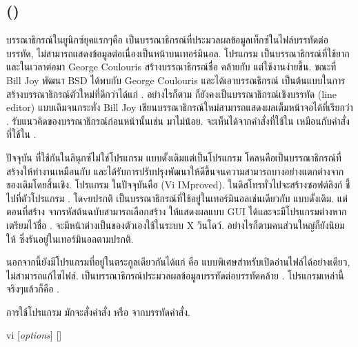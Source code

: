\begin{thwbr}
\subsection{()}
บรรณาธิกรณ์ในยูนิกซ์ยุคแรกๆคือ  เป็นบรรณาธิกรณ์ที่ประมวลผลข้อมูลเท็กซ์ในไฟล์บรรทัดต่อบรรทัด, ไม่สามารถแสดงข้อมูลต่อเนื่องเป็นหน้าบนเทอร์มินอล. โปรแกรม  เป็นบรรณาธิกรณ์ที่ใช้ยากและในเวลาต่อมา George Coulouris\cite{em} สร้างบรรณาธิกรณ์ชื่อ  คล้ายกับ  แต่ใช้งานง่ายขึ้น. ขณะที่ Bill Joy พัฒนา BSD ได้พบกับ George Coulouris และได้เอาบรรณธิกรณ์  เป็นต้นแบบในการสร้างบรรณาธิกรณ์ตัวใหม่ที่ดีกว่าได้แก่ . อย่างไรก็ตาม  ก็ยังคงเป็นบรรณาธิกรณ์เชิงบรรทัด (line editor) แบบเดิมจนกระทั่ง Bill Joy เขียนบรรณาธิกรณ์ใหม่สามารถแสดงผลเต็มหน้าจอได้ที่เรียกว่า .  รับแนวคิดของบรรณาธิกรณ์ก่อนหน้านั้นเช่น  มาไม่น้อย. จะเห็นได้จากคำสั่งที่ใช้ใน  เหมือนกับคำสั่งที่ใช้ใน . 

ปัจจุบัน  ที่ใช้กันในลินุกซ์ไม่ใช่โปรแกรม  แบบดั้งเดิมแต่เป็นโปรแกรม  โคลนคือเป็นบรรณาธิกรณ์ที่สร้างให้ทำงานเหมือนกับ  และได้รับการปรับปรุงพัฒนาให้ดีขึ้นจนความสามารถบางอย่างแตกต่างจากของเดิมโดยสิ้นเชิง. โปรแกรม  ในปัจจุบันคือ  (Vi IMproved). ในดิสโทรทั่วไปจะสร้างซอฟต์ลิงก์  ชี้ไปที่ตัวโปรแกรม . โดvยปรกติ  เป็นบรรณาธิกรณ์ที่ใช้อยู่ในเทอร์มินอลเช่นเดียวกับ  แบบดั้งเดิม. แต่ตอนที่สร้าง  จากรหัสต้นฉบับสามารถเลือกสร้าง  ให้แสดงผลแบบ GUI ได้และจะมีโปรแกรมต่างหากเตรียมไว้ชื่อ .  จะมีหน้าต่างเป็นของตัวเองใช้ในระบบ X วินโดว์. อย่างไรก็ตามคนส่วนใหญ่ก็ยังนิยมให้  ซึ่งรันอยู่ในเทอร์มินอลตามปรกติ. 

นอกจากนี้ยังมีโปรแกรมที่อยู่ในตระกูลเดียวกันได้แก่  คือ  แบบพิเศษสำหรับเปิดอ่านไฟล์ได้อย่างเดียว, ไม่สามารถแก้ไขไฟล์.  เป็นบรรณาธิกรณ์ประมวลผลข้อมูลบรรทัดต่อบรรทัดคล้าย . โปรแกรมเหล่านี้จริงๆแล้วก็คือ . 

การใช้โปรแกรม  มักจะสั่งคำสั่ง  หรือ  จากบรรทัดคำสั่ง.
\begin{MyVerbatim}
vi [\textit{options}] []
\end{MyVerbatim}


\end{thwbr}
